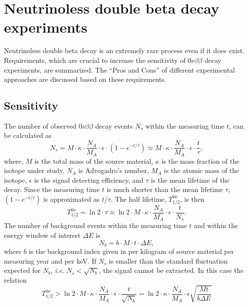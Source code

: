 \chapter{Neutrinoless double beta decay experiments}
\label{cha:exps}
Neutrinoless double beta decay is an extremely rare process even if it does exist. Requirements, which are crucial to increase the sensitivity of $0\nu\beta\beta$ decay experiments, are summarized. The ``Pros and Cons'' of different experimental approaches are discussed based on these requirements.

\section{Sensitivity}
\label{sec:sensi}
The number of observed $0\nu\beta\beta$ decay events $N_{s}$ within the measuring time $t$, can be calculated as
\begin{equation}
  \label{eq:gerda:ns}
  N_{s} = M \cdot \kappa \cdot \frac{N_{A}}{M_{A}} \cdot \epsilon \cdot (1 - e^{-t/\tau}) \approx M \cdot \kappa \cdot \frac{N_{A}}{M_{A}} \cdot \epsilon \cdot \frac{t}{\tau},
\end{equation}
where, $M$ is the total mass of the source material, $\kappa$ is the mass fraction of the isotope under study, $N_{A}$ is Advogadro's number, $M_{A}$ is the atomic mass of the isotope, $\epsilon$ is the signal detecting efficiency, and $\tau$ is the mean lifetime of the decay. Since the measuring time $t$ is much shorter than the mean lifetime $\tau$, $(1 - e^{-t/\tau})$ is approximated as $t/\tau$. The half lifetime, $T^{0\nu}_{1/2}$, is then
\begin{equation}
  \label{eq:gerda:thalf}
  T^{0\nu}_{1/2} = \ln2 \cdot \tau \approx \ln2 \cdot M \cdot \kappa \cdot \frac{N_{A}}{M_{A}} \cdot \epsilon \cdot \frac{t}{N_{s}}.
\end{equation}
The number of background events within the measuring time $t$ and within the energy window of interest $\Delta E$ is 
\begin{equation}
  \label{eq:gerda:nb}
  N_{b} = b \cdot M \cdot t \cdot \Delta E,
\end{equation}
where $b$ is the background index given in per kilogram of source material per measuring year and per keV. If $N_{s}$ is smaller than the standard fluctuation expected for $N_{b}$, \textit{i.e.} $N_{s}<\sqrt{N_{b}}$, the signal cannot be extracted. In this case the relation
\begin{equation}
  \label{eq:gerda:thalfb}
  T^{0\nu}_{1/2} > \ln2 \cdot M \cdot \kappa \cdot \frac{N_{A}}{M_{A}} \cdot \epsilon \cdot \frac{t}{\sqrt{N_{b}}} = \ln2 \cdot \kappa \cdot \frac{N_{A}}{M_{A}} \cdot \epsilon \sqrt{\frac{M t}{b \Delta E}}
\end{equation}
